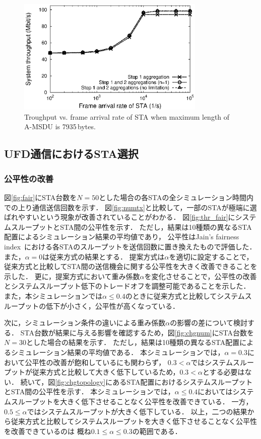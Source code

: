 \documentclass[master]{kuisthesis}		%
\begin{document}
			\begin{figure}[t]
				\begin{center}
					\includegraphics[width=0.8\textwidth]{graph/thr_lmd.eps}
					\caption{Troughput vs. frame arrival rate of STA when maximum length of A-MSDU is 7935\,bytes.}
					\label{fig:thr_lmd}
				\end{center}
			\end{figure}
	\subsection{UFD通信におけるSTA選択}
		\subsubsection{公平性の改善}
			図\ref{fig:fair}にSTA台数を$N=50$とした場合の各STAの全シミュレーション時間内での上り通信送信回数を示す．
			図\ref{fig:numtx}と比較して，一部のSTAが極端に選ばれやすいという現象が改善されていることがわかる．
			図\ref{fig:thr_fair}にシステムスループットとSTA間の公平性を示す．
			ただし，結果は10種類の異なるSTA配置によるシミュレーション結果の平均値であり，
			公平性はJain's fairness index~\cite{jain}における各STAのスループットを送信回数に置き換えたもので評価した．
			また，$\alpha=0$は従来方式の結果とする．
			提案方式は$\alpha$を適切に設定することで，従来方式と比較してSTA間の送信機会に関する公平性を大きく改善できることを示した．
			更に，提案方式において重み係数$\alpha$を変化させることで，公平性の改善とシステムスループット低下のトレードオフを調整可能であることを示した．
			また，本シミュレーションでは$\alpha\leq0.4$のときに従来方式と比較してシステムスループットの低下が小さく，公平性が高くなっている．
			\par
			次に，シミュレーション条件の違いによる重み係数$\alpha$の影響の差について検討する．
			STA台数が結果に与える影響を確認するため，図\ref{fig:chgnum}にSTA台数を$N=30$とした場合の結果を示す．
			ただし，結果は10種類の異なるSTA配置によるシミュレーション結果の平均値である．
			本シミュレーションでは，$\alpha=0.3$において公平性の改善が飽和しているにも関わらず，
			$0.3<\alpha$ではシステムスループットが従来方式と比較して大きく低下しているため，$0.3<\alpha$とする必要はない．
			続いて，図\ref{fig:chgtopology}にあるSTA配置におけるシステムスループットとSTA間の公平性を示す．
			本シミュレーションでは，$\alpha\leq0.4$においてはシステムスループットを大きく低下させることなく公平性を改善できている．
			一方，$0.5\leq\alpha$ではシステムスループットが大きく低下している．
			以上，二つの結果から従来方式と比較してシステムスループットを大きく低下させることなく公平性を改善できているのは
			概ね$0.1\leq\alpha\leq0.3$の範囲である．
\end{document}
